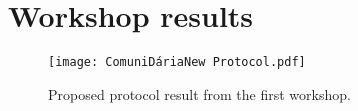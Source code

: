 
%

\chapter{Workshop results}

\begin{figure}
    \centering
    \texttt{[image: ComuniDáriaNew Protocol.pdf]}
    \caption{Proposed protocol result from the first workshop.}
    \label{fig:PROPOSED_workshop1}
\end{figure}